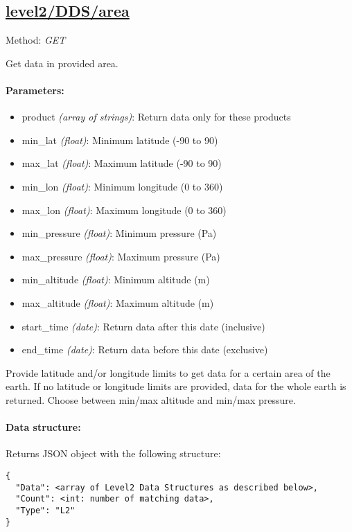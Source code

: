 \subsection{\url{level2/DDS/area}}
\label{api:area}
Method: \emph{GET}

Get data in provided area.

\paragraph{Parameters:}
\begin{itemize}
    \item product \emph{(array of strings)}: Return data only for these
        products
    \item min\_lat \emph{(float)}: Minimum latitude (-90 to 90)
    \item max\_lat \emph{(float)}: Maximum latitude (-90 to 90)
    \item min\_lon \emph{(float)}: Minimum longitude (0 to 360)
    \item max\_lon \emph{(float)}: Maximum longitude (0 to 360)
    \item min\_pressure \emph{(float)}: Minimum pressure (Pa)
    \item max\_pressure \emph{(float)}: Maximum pressure (Pa)
    \item min\_altitude \emph{(float)}: Minimum altitude (m)
    \item max\_altitude \emph{(float)}: Maximum altitude (m)
    \item start\_time \emph{(date)}: Return data after this date (inclusive)
    \item end\_time \emph{(date)}: Return data before this date (exclusive)
\end{itemize}

Provide latitude and/or longitude limits to get data for a certain area of the
earth. If no latitude or longitude limits are provided, data for the whole
earth is returned. Choose between min/max altitude and min/max pressure.

\paragraph{Data structure:}
Returns JSON object with the following structure:

\begin{lstlisting}[basicstyle=\footnotesize]
{
  "Data": <array of Level2 Data Structures as described below>,
  "Count": <int: number of matching data>,
  "Type": "L2"
}
\end{lstlisting}


